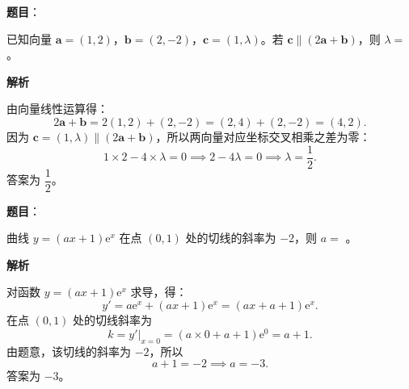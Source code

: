 \begin{answer}

\textbf{题目}：

已知向量 $\boldsymbol a = (1, 2)$，$\boldsymbol b = (2, -2)$，$\boldsymbol c = (1, \lambda)$。若 $\boldsymbol c \parallel (2\boldsymbol a + \boldsymbol b)$，则 $\lambda =$ \underline{\hspace{2cm}}。

\textbf{解析}

由向量线性运算得：
\nopagebreak[4]
\[2\boldsymbol a + \boldsymbol b = 2(1, 2) + (2, -2) = (2, 4) + (2, -2) = (4, 2).\]
因为 $\boldsymbol c = (1, \lambda) \parallel (2\boldsymbol a + \boldsymbol b)$，所以两向量对应坐标交叉相乘之差为零：
\nopagebreak[4]
\[1 \times 2 - 4 \times \lambda = 0 \implies 2 - 4\lambda = 0 \implies \lambda = \dfrac12.\]
答案为 $\dfrac12$。


\end{answer}
\begin{answer}

\textbf{题目}：

曲线 $y = (ax + 1)\mathrm e^x$ 在点 $(0, 1)$ 处的切线的斜率为 $-2$，则 $a =$ \underline{\hspace{2cm}}。

\textbf{解析}

对函数 $y = (ax + 1)\mathrm e^x$ 求导，得：
\nopagebreak[4]
\[y' = a\mathrm e^x + (ax + 1)\mathrm e^x = (ax + a + 1)\mathrm e^x.\]
在点 $(0, 1)$ 处的切线斜率为
\nopagebreak[4]
\[k = y'|_{x=0} = (a \times 0 + a + 1)\mathrm e^0 = a + 1.\]
由题意，该切线的斜率为 $-2$，所以
\nopagebreak[4]
\[a + 1 = -2 \implies a = -3.\]
答案为 $-3$。


\end{answer}
